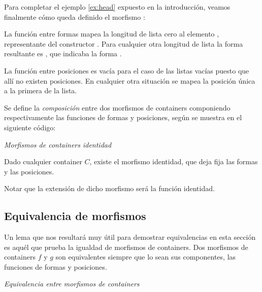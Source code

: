 \begin{example} Para completar el ejemplo \ref{ex:head} expuesto en la introducción, veamos finalmente cómo queda definido el morfismo :


La función entre formas mapea la longitud de lista cero al elemento , representante del constructor . Para cualquier otra longitud de lista la forma resultante es , que indicaba la forma .

La función entre posiciones es vacía para el caso de las listas vacías puesto que allí no existen posiciones. En cualquier otra situación se mapea la posición única  a la primera de la lista. 

\end{example}

\begin{definition}\label{code:morph:comp}Se define la {\it composición} entre dos morfismos de containers componiendo respectivamente las funciones de formas y posiciones, según se muestra en el siguiente código:
  
\end{definition}

\begin{example}\label{code:morph:id}{\it Morfismos de containers identidad}

Dado cualquier container $C$, existe el morfismo identidad, que deja fija las formas y las posiciones.
  
  Notar que la extensión de dicho morfismo será la función identidad.
\end{example}

\subsection{Equivalencia de morfismos}

Un lema que nos resultará muy útil para demostrar equivalencias en esta sección es aquél que prueba la igualdad de morfismos de containers. Dos morfismos de containers $f$ y $g$ son equivalentes siempre que lo sean sus componentes, las funciones de formas y posiciones.

\begin{agdacode}\label{morph:equivalence}{\it Equivalencia entre morfismos de containers}
  
\end{agdacode}

